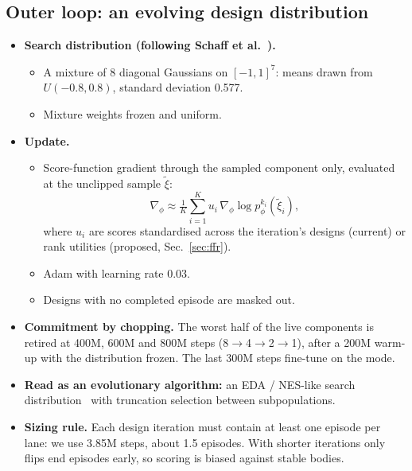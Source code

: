 \documentclass[sigconf,review]{acmart}
\begin{document}
\subsection{Outer loop: an evolving design distribution}
\begin{itemize}
\item \textbf{Search distribution (following Schaff et al.~\cite{schaff2019jointly}).}
  \begin{itemize}
  \item A mixture of 8 diagonal Gaussians on $[-1, 1]^7$: means drawn from $U(-0.8, 0.8)$, standard deviation 0.577.
  \item Mixture weights frozen and uniform.
  \end{itemize}
\item \textbf{Update.}
  \begin{itemize}
  \item Score-function gradient through the sampled component only, evaluated at the unclipped sample $\tilde\xi$:
  \begin{equation}
  \nabla_\phi \approx \tfrac{1}{K}\textstyle\sum_{i=1}^{K} u_i\,\nabla_\phi \log p_\phi^{k_i}(\tilde\xi_i),
  \end{equation}
  where $u_i$ are scores standardised across the iteration's designs (current) or rank utilities (proposed, Sec.~\ref{sec:ffr}).
  \item Adam with learning rate 0.03.
  \item Designs with no completed episode are masked out.
  \end{itemize}
\item \textbf{Commitment by chopping.} The worst half of the live components is retired at 400M, 600M and 800M steps (8$\to$4$\to$2$\to$1), after a 200M warm-up with the distribution frozen. The last 300M steps fine-tune on the mode.
\item \textbf{Read as an evolutionary algorithm:} an EDA / NES-like search distribution~\cite{larranaga2002estimation,wierstra2014natural} with truncation selection between subpopulations.
\item \textbf{Sizing rule.} Each design iteration must contain at least one episode per lane: we use 3.85M steps, about 1.5 episodes. With shorter iterations only flips end episodes early, so scoring is biased against stable bodies.
\end{itemize}
\end{document}
